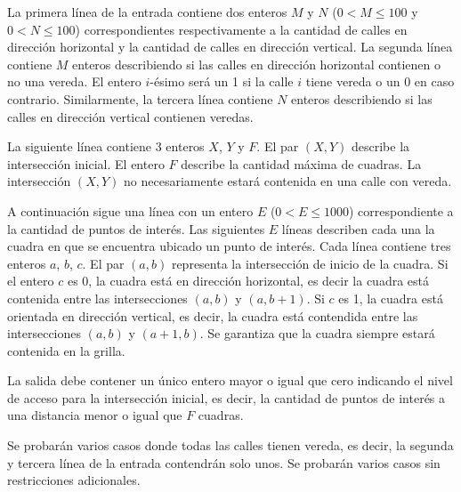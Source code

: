 \documentclass{oci}
\begin{document}
\begin{inputDescription}
  La primera línea de la entrada contiene dos enteros $M$ y $N$ ($0 < M \leq 100$ y $0 < N\leq 100$)
  correspondientes respectivamente a la cantidad de calles en dirección horizontal y la cantidad de
  calles en dirección vertical.
  La segunda línea contiene $M$ enteros describiendo si las calles en dirección horizontal
  contienen o no una vereda.
  El entero $i$-ésimo será un 1 si la calle $i$ tiene vereda o un 0 en caso contrario.
  Similarmente, la tercera línea contiene $N$ enteros describiendo si las calles en dirección
  vertical contienen veredas.

  La siguiente línea contiene 3 enteros $X$, $Y$ y $F$.
  El par $(X, Y)$ describe la intersección inicial.
  El entero $F$ describe la cantidad máxima de cuadras.
  La intersección $(X, Y)$ no necesariamente estará contenida en una calle con vereda.

  A continuación sigue una línea con un entero $E$ ($0 < E \leq 1000$) correspondiente a la cantidad
  de puntos de interés.
  Las siguientes $E$ líneas describen cada una la cuadra en que se encuentra ubicado un punto de interés.
  Cada línea contiene tres enteros $a$, $b$, $c$.
  El par $(a, b)$ representa la intersección de inicio de la cuadra.
  Si el entero $c$ es 0, la cuadra está en dirección horizontal, es decir la cuadra está contenida entre las
  intersecciones $(a, b)$ y $(a, b + 1)$.
  Si $c$ es 1, la cuadra está orientada en dirección vertical, es decir, la cuadra está contendida entre
  las intersecciones $(a, b)$ y $(a + 1, b)$.
  Se garantiza que la cuadra siempre estará contenida en la grilla.
\end{inputDescription}

\begin{outputDescription}
  La salida debe contener un único entero mayor o igual que cero indicando el nivel de acceso para
  la intersección inicial, es decir, la cantidad de puntos de interés a una distancia menor o igual
  que $F$ cuadras.
\end{outputDescription}

\begin{scoreDescription}
  Se probarán varios casos donde todas las calles tienen vereda, es decir, la segunda y tercera
  línea de la entrada contendrán solo unos.
  Se probarán varios casos sin restricciones adicionales.
\end{scoreDescription}

\begin{sampleDescription}
\end{sampleDescription}
\end{document}

